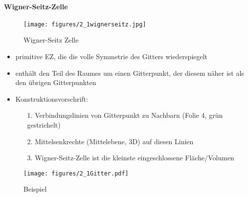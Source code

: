 \paragraph{Wigner-Seitz-Zelle}
\begin{figure}[H]
    \centering
    \texttt{[image: figures/2\_1wignerseitz.jpg]}
    \caption{Wigner-Seitz Zelle}
    \label{}
\end{figure}
\begin{itemize}
    \item primitive EZ, die die volle Symmetrie des Gitters wiederspiegelt
    \item enthält den Teil des Raumes um einen Gitterpunkt, der diesem näher ist als den übrigen Gitterpunkten
    \item Konstruktionsvorschrift:
          \begin{itemize}
              \item[1.] Verbindungslinien von Gitterpunkt zu Nachbarn (Folie 4, grün gestrichelt)
              \item[2.] Mittelsenkrechte (Mittelebene, 3D) auf diesen Linien
              \item[3.] Wigner-Seitz-Zelle ist die kleinste eingeschlossene Fläche/Volumen
          \end{itemize}
\end{itemize}
\begin{figure}[H]
    \centering
    \texttt{[image: figures/2\_1Gitter.pdf]}
    \caption{Beispiel}
    \label{}
\end{figure}
